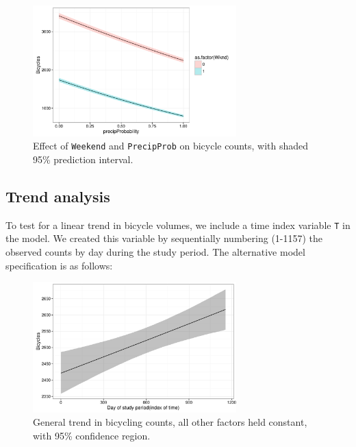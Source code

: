 \documentclass [11pt, proquest] {uwthesis}[2015/03/03]
\begin{document}
\begin{figure}
\centering
   \includegraphics[width=0.7\textwidth]{figures/sim/interact} 
  \caption{Effect of \texttt{Weekend} and \texttt{PrecipProb} on bicycle counts, with shaded 95\% prediction interval.}
  \label{fig:interact}
\end{figure}

\subsection{Trend analysis}
To test for a linear trend in bicycle volumes, we include a time index variable \texttt{T} in the model. We created this variable by sequentially numbering (1-1157) the observed counts by day during the study period. The alternative model specification is as follows:

\begin{figure}
\centering
   \includegraphics[width=0.7\textwidth]{figures/sim/trend} 
  \caption{General trend in bicycling counts, all other factors held constant, with 95\% confidence region.}
  \label{fig:trend}
\end{figure}
\end{document}
